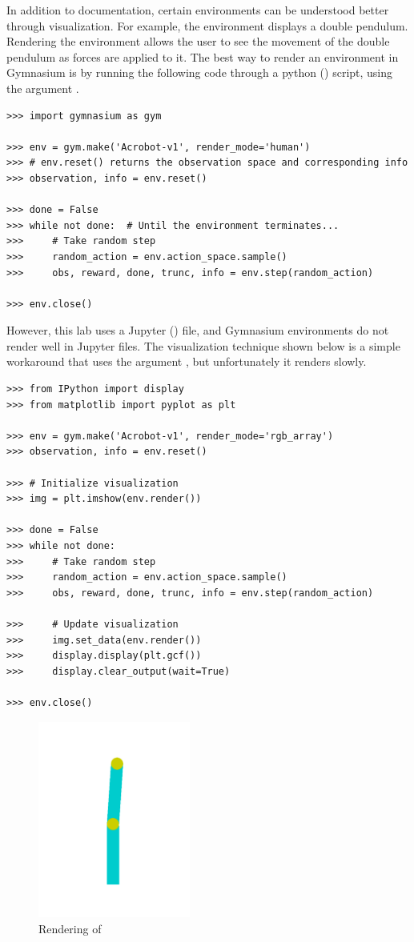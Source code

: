 In addition to documentation, certain environments can be understood better through visualization.
For example, the environment  displays a double pendulum.
Rendering the environment allows the user to see the movement of the double pendulum as forces are applied to it.
The best way to render an environment in Gymnasium is by running the following code through a python () script, using the argument .

\begin{lstlisting}
>>> import gymnasium as gym

>>> env = gym.make('Acrobot-v1', render_mode='human')
>>> # env.reset() returns the observation space and corresponding info
>>> observation, info = env.reset()

>>> done = False
>>> while not done:  # Until the environment terminates...
>>>     # Take random step
>>>     random_action = env.action_space.sample()
>>>     obs, reward, done, trunc, info = env.step(random_action)

>>> env.close()
\end{lstlisting}
However, this lab uses a Jupyter () file, and Gymnasium environments do not render well in Jupyter files.
The visualization technique shown below is a simple workaround that uses the argument , but unfortunately it renders slowly.
\begin{lstlisting}
>>> from IPython import display
>>> from matplotlib import pyplot as plt

>>> env = gym.make('Acrobot-v1', render_mode='rgb_array')
>>> observation, info = env.reset()

>>> # Initialize visualization
>>> img = plt.imshow(env.render())

>>> done = False
>>> while not done:
>>>     # Take random step
>>>     random_action = env.action_space.sample()
>>>     obs, reward, done, trunc, info = env.step(random_action)

>>>     # Update visualization
>>>     img.set_data(env.render())
>>>     display.display(plt.gcf())
>>>     display.clear_output(wait=True)

>>> env.close()
\end{lstlisting}

\begin{figure}[H]
\includegraphics[width=5cm]{figures/acrobot.pdf}
\caption{Rendering of }
\end{figure}


